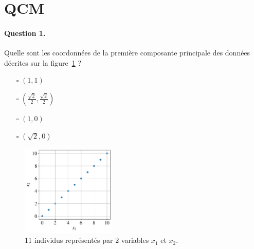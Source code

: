 \section{QCM}

\paragraph{Question 1.} Quelle sont les coordonnées de la première composante principale des données décrites sur la figure~\ref{fig:pca_2d} ?
\begin{itemize}
\item[$\square$] $(1, 1)$
\item[$\square$] $\left(\frac{\sqrt{2}}{2}, \frac{\sqrt{2}}{2}\right)$
\item[$\square$] $(1, 0)$
\item[$\square$] $(\sqrt{2}, 0)$ 
\end{itemize}

\vspace{-100pt}
\begin{figure}[h]
  \centering
  \includegraphics[width=0.4\textwidth]{figures/pca_2d}
  \caption{11 individus représentés par 2 variables $x_1$ et $x_2$.}
  \label{fig:pca_2d}
\end{figure}




